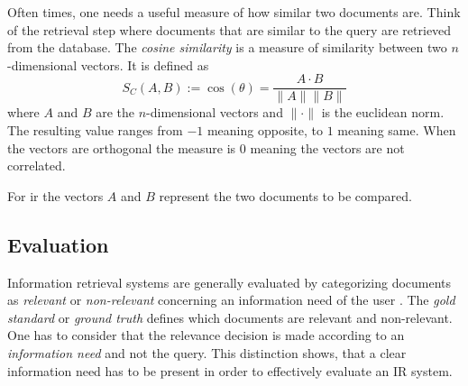 \documentclass[../main.tex]{subfiles}
\begin{document}
Often times, one needs a useful measure of how similar two documents are.
Think of the retrieval step where documents that are similar to the query
are retrieved from the database.
The \emph{cosine similarity} is a measure of similarity
between two $n$-dimensional vectors.
It is defined as
\begin{equation}
    S_C(A,B) := \cos(\theta) = \frac{A \cdot B}{\lVert A \rVert \lVert B \rVert}
\end{equation}
where $A$ and $B$ are the $n$-dimensional vectors and $\lVert \cdot \rVert$ is the
euclidean norm. The resulting value ranges from $-1$ meaning opposite, to $1$ meaning
same. When the vectors are orthogonal the measure is $0$ meaning the vectors are not
correlated.

For \gls{ir} the vectors $A$ and $B$ represent the two documents to be compared.



\subsection{Evaluation}

Information retrieval systems are generally evaluated by categorizing documents
as \emph{relevant} or \emph{non-relevant} concerning an information need of the user \cite{Manning2009}.
The \emph{gold standard} or \emph{ground truth} defines which documents are relevant and non-relevant.
One has to consider that the relevance
decision is made according to an \emph{information need} and not the query.
This distinction shows,
that a clear information need has to be present in order to effectively evaluate an IR system.
\end{document}
